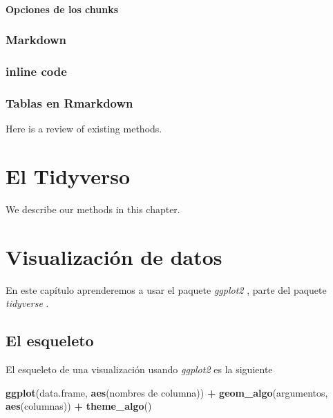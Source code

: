 \documentclass[]{book}
\newenvironment{Shaded}{\begin{snugshade}}{\end{snugshade}}
\newcommand{\KeywordTok}[1]{\textcolor[rgb]{0.13,0.29,0.53}{\textbf{#1}}}
\newcommand{\NormalTok}[1]{#1}
\newcommand{\OperatorTok}[1]{\textcolor[rgb]{0.81,0.36,0.00}{\textbf{#1}}}
\newcommand{\StringTok}[1]{\textcolor[rgb]{0.31,0.60,0.02}{#1}}
\begin{document}
\hypertarget{opciones-de-los-chunks}{%
\subsubsection{Opciones de los chunks}\label{opciones-de-los-chunks}}

\hypertarget{markdown}{%
\subsection{Markdown}\label{markdown}}

\hypertarget{inline-code}{%
\subsection{inline code}\label{inline-code}}

\hypertarget{tablas-en-rmarkdown}{%
\subsection{Tablas en Rmarkdown}\label{tablas-en-rmarkdown}}

Here is a review of existing methods.

\hypertarget{tidyverso}{%
\chapter{El Tidyverso}\label{tidyverso}}

We describe our methods in this chapter.

\hypertarget{visualizacion}{%
\chapter{Visualización de datos}\label{visualizacion}}

En este capítulo aprenderemos a usar el paquete \emph{ggplot2}
\citep{Wickhamggplot}, parte del paquete \emph{tidyverse}
\citep{Wickhamtidyverse}.

\hypertarget{el-esqueleto}{%
\section{El esqueleto}\label{el-esqueleto}}

El esqueleto de una visualización usando \emph{ggplot2} es la siguiente

\begin{Shaded}
\begin{Highlighting}[]
\KeywordTok{ggplot}\NormalTok{(data.frame, }\KeywordTok{aes}\NormalTok{(nombres de columna)) }\OperatorTok{+}\StringTok{ }\KeywordTok{geom_algo}\NormalTok{(argumentos, }\KeywordTok{aes}\NormalTok{(columnas)) }\OperatorTok{+}\StringTok{ }\KeywordTok{theme_algo}\NormalTok{()}
\end{Highlighting}
\end{Shaded}
\end{document}

